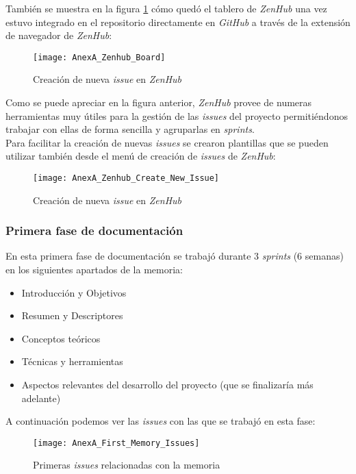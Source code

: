También se muestra en la figura \ref{fig:AnexA_Zenhub_Board} cómo quedó el tablero de \textit{ZenHub} una vez estuvo integrado en el repositorio directamente en \textit{GitHub} a través de la extensión de navegador de \textit{ZenHub}:

\begin{figure}[!h]
	\centering
	\texttt{[image: AnexA\_Zenhub\_Board]}
	\caption{Creación de nueva \textit{issue} en \textit{ZenHub}}
	\label{fig:AnexA_Zenhub_Board}
\end{figure}
\FloatBarrier

Como se puede apreciar en la figura anterior, \textit{ZenHub} provee de numeras herramientas muy útiles para la gestión de las \textit{issues} del proyecto permitiéndonos trabajar con ellas de forma sencilla y agruparlas en \textit{sprints}.\\
Para facilitar la creación de nuevas \textit{issues} se crearon plantillas que se pueden utilizar también desde el menú de creación de \textit{issues} de \textit{ZenHub}:

\begin{figure}[!h]
	\centering
	\texttt{[image: AnexA\_Zenhub\_Create\_New\_Issue]}
	\caption{Creación de nueva \textit{issue} en \textit{ZenHub}}
	\label{fig:AnexA_Zenhub_Create_New_Issue}
\end{figure}
\FloatBarrier

\subsubsection{Primera fase de documentación}

En esta primera fase de documentación se trabajó durante 3 \textit{sprints} (6 semanas) en los siguientes apartados de la memoria:

\begin{itemize}
	\item Introducción y Objetivos
	\item Resumen y Descriptores
	\item Conceptos teóricos
	\item Técnicas y herramientas
	\item Aspectos relevantes del desarrollo del proyecto (que se finalizaría más adelante)
\end{itemize}

A continuación podemos ver las \textit{issues} con las que se trabajó en esta fase:

\begin{figure}[!h]
	\centering
	\texttt{[image: AnexA\_First\_Memory\_Issues]}
	\caption{Primeras \textit{issues} relacionadas con la memoria}
	\label{fig:AnexA_First_Memory_Issues}
\end{figure}
\FloatBarrier


